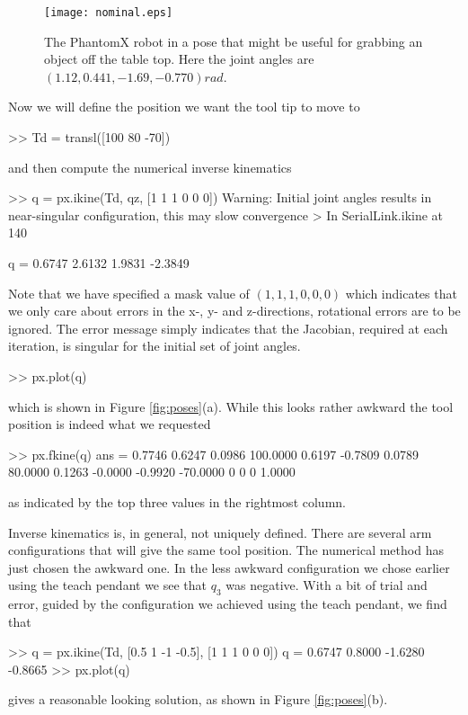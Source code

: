 \documentclass[11pt]{article}
\begin{document}
	\begin{figure}
	\centering
	\texttt{[image: nominal.eps]}
	\caption{The PhantomX robot in a pose that might be useful for grabbing an object off the table top.  Here the joint angles
	are $(1.12, 0.441, -1.69, -0.770)\unit{rad}$.}
	\label{fig:nominal-pose}
	\end{figure}

Now we will define the position we want the tool tip to move to
\begin{Code}
>> Td = transl([100 80 -70])
\end{Code}
and then compute the numerical inverse kinematics
\begin{Code}
>> q = px.ikine(Td, qz, [1 1 1 0 0 0])
Warning: Initial joint angles results in near-singular configuration, this may slow convergence 
> In SerialLink.ikine at 140 

q =
    0.6747    2.6132    1.9831   -2.3849
\end{Code}
Note that we have specified a mask value of $(1, 1, 1, 0, 0, 0)$ which indicates that we only care about errors in the x-, y- and z-directions,
rotational errors are to be ignored.
The error message simply indicates that the Jacobian, required at each iteration, is singular for the initial set of joint angles.
\begin{Code}
>> px.plot(q)
\end{Code}
which is shown in Figure \ref{fig:poses}(a).
While this looks rather awkward the tool position is indeed what we requested
\begin{Code}
>> px.fkine(q)
ans =
    0.7746    0.6247    0.0986  100.0000
    0.6197   -0.7809    0.0789   80.0000
    0.1263   -0.0000   -0.9920  -70.0000
         0         0         0    1.0000
\end{Code}
as indicated by the top three values in the rightmost column.

Inverse kinematics is, in general, not uniquely defined.  There are several arm configurations that will give the same tool position.  The numerical
method has just chosen the awkward one.
In the less awkward configuration we chose earlier using the teach pendant we see that $q_3$ was negative.
With a bit of trial and error, guided by the configuration we achieved using the teach pendant, we find that
\begin{Code}
>> q = px.ikine(Td, [0.5 1 -1 -0.5], [1 1 1 0 0 0])
q =
    0.6747    0.8000   -1.6280   -0.8665
>> px.plot(q)
\end{Code}
 gives a reasonable looking solution, as shown in Figure \ref{fig:poses}(b).
\end{document}
